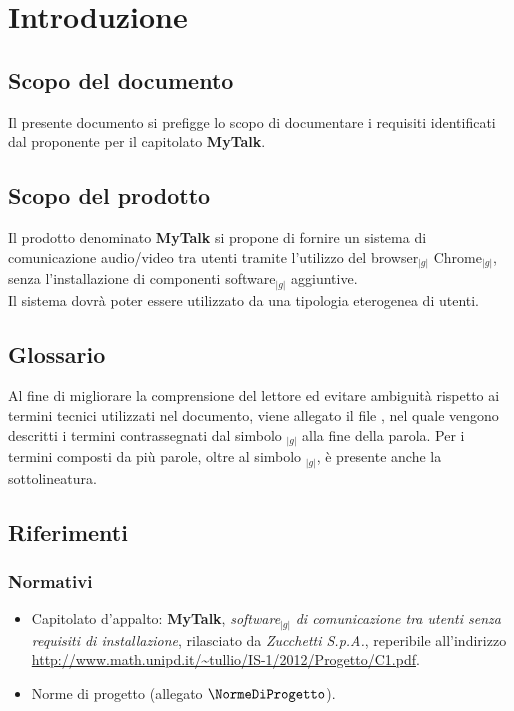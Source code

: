\section{Introduzione} {
	\subsection{Scopo del documento}
		Il presente documento si prefigge lo scopo di documentare i requisiti identificati dal proponente \emph{\Zucchetti} per il capitolato \textbf{MyTalk}.
	\subsection{Scopo del prodotto}
		Il prodotto denominato \textbf{MyTalk} si propone di fornire un sistema di comunicazione audio/video tra utenti tramite 
		l'utilizzo del browser$_{|g|}$ Chrome$_{|g|}$, senza l'installazione di componenti software$_{|g|}$ aggiuntive.\\
		Il sistema dovrà poter essere utilizzato da una tipologia eterogenea di utenti.
	\subsection{Glossario}
		Al fine di migliorare la comprensione del lettore ed evitare ambiguità rispetto ai termini tecnici utilizzati nel documento, viene allegato il file
		\emph{\Glossario}, nel quale vengono descritti i termini contrassegnati dal simbolo $_{|g|}$ alla fine della parola.
		Per i termini composti da pi\`u parole, oltre al simbolo $_{|g|}$, \`e presente anche la sottolineatura. 
	\subsection{Riferimenti}
	\subsubsection{Normativi}
		\begin{itemize}
			\item Capitolato d'appalto: \textbf{MyTalk}, \textit{software}$_{|g|}$ \textit{di comunicazione tra utenti senza requisiti  di installazione}, rilasciato da \textit{Zucchetti S.p.A.}, reperibile all'indirizzo \url{http://www.math.unipd.it/~tullio/IS-1/2012/Progetto/C1.pdf}.
			\item Norme di progetto (allegato $\NormeDiProgetto$).
		\end{itemize}
}
